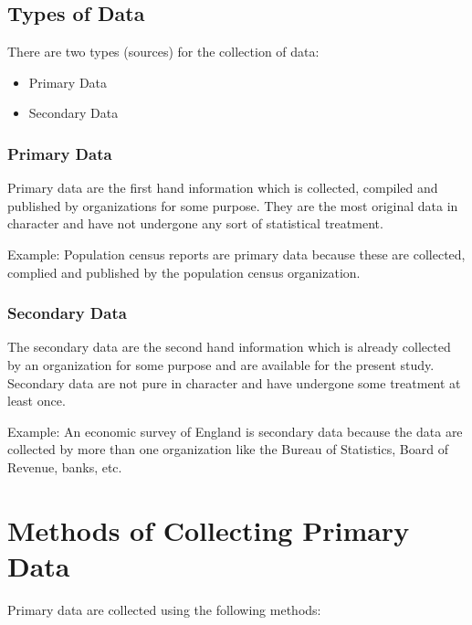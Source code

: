 \documentclass[
]{book}
\providecommand{\tightlist}{%
  \setlength{\itemsep}{0pt}\setlength{\parskip}{0pt}}
\begin{document}
\hypertarget{types-of-data}{%
\subsection{Types of Data}\label{types-of-data}}

There are two types (sources) for the collection of data:

\begin{itemize}
\tightlist
\item
  Primary Data\\
\item
  Secondary Data
\end{itemize}

\hypertarget{primary-data}{%
\subsubsection{Primary Data}\label{primary-data}}

Primary data are the first hand information which is collected, compiled
and published by organizations for some purpose. They are the most
original data in character and have not undergone any sort of
statistical treatment.

Example: Population census reports are primary data because these are
collected, complied and published by the population census organization.

\hypertarget{secondary-data}{%
\subsubsection{Secondary Data}\label{secondary-data}}

The secondary data are the second hand information which is already
collected by an organization for some purpose and are available for the
present study. Secondary data are not pure in character and have
undergone some treatment at least once.

Example: An economic survey of England is secondary data because the
data are collected by more than one organization like the Bureau of
Statistics, Board of Revenue, banks, etc.

\hypertarget{methods-of-collecting-primary-data}{%
\section{Methods of Collecting Primary Data}\label{methods-of-collecting-primary-data}}

Primary data are collected using the following methods:
\end{document}
